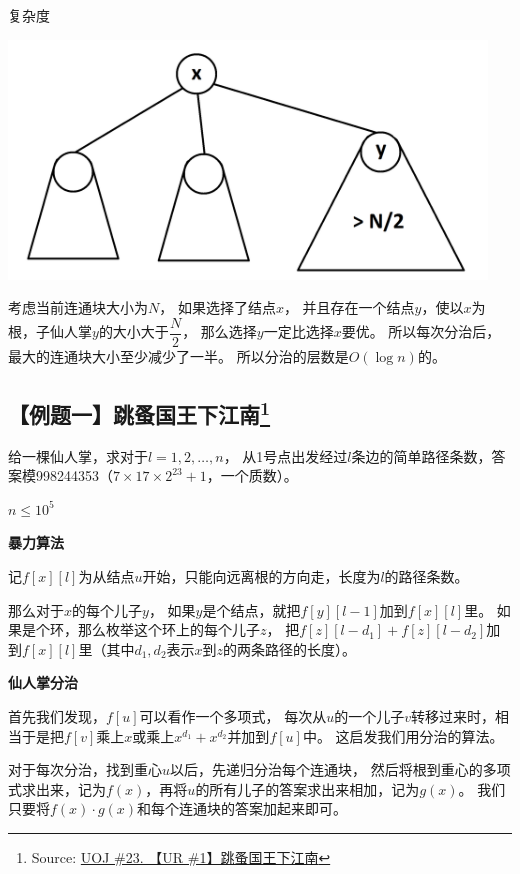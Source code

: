 \documentclass{noithesis}
\begin{document}
\text{}
\newpage

$\textbf{复杂度}$

\includegraphics[width=360pt,height=180pt]{images/dac-n-div-2.png}

考虑当前连通块大小为$N$，
如果选择了结点$x$，
并且存在一个结点$y$，使以$x$为根，子仙人掌$y$的大小大于$\dfrac{N}{2}$，
那么选择$y$一定比选择$x$要优。
所以每次分治后，最大的连通块大小至少减少了一半。
所以分治的层数是$O(\log n)$的。

\subsection{【例题一】跳蚤国王下江南\protect\footnote{Source: \href{http://uoj.ac/problem/23}{UOJ \#23. 【UR \#1】跳蚤国王下江南}}}

给一棵仙人掌，求对于$l = 1, 2, \dots, n$，
从1号点出发经过$l$条边的简单路径条数，答案模998244353（$7 \times 17 \times 2^{23} + 1$，一个质数）。

$n \le 10^5$

\text{}

\textbf{暴力算法}

记$f[x][l]$为从结点$u$开始，只能向远离根的方向走，长度为$l$的路径条数。

那么对于$x$的每个儿子$y$，
如果$y$是个结点，就把$f[y][l-1]$加到$f[x][l]$里。
如果是个环，那么枚举这个环上的每个儿子$z$，
把$f[z][l-d_1]+f[z][l-d_2]$加到$f[x][l]$里（其中$d_1, d_2$表示$x$到$z$的两条路径的长度）。

\textbf{仙人掌分治}

首先我们发现，$f[u]$可以看作一个多项式，
每次从$u$的一个儿子$v$转移过来时，相当于是把$f[v]$乘上$x$或乘上$x ^ {d_1} + x ^ {d_2}$并加到$f[u]$中。
这启发我们用分治的算法。

对于每次分治，找到重心$u$以后，先递归分治每个连通块，
然后将根到重心的多项式求出来，记为$f(x)$，再将$u$的所有儿子的答案求出来相加，记为$g(x)$。
我们只要将$f(x) \cdot g(x)$和每个连通块的答案加起来即可。
\end{document}
